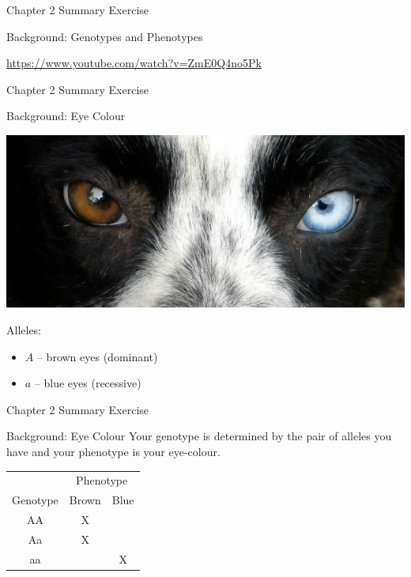 \documentclass[aspectratio=169,xcolor=pdftex,dvipsnames,table]{beamer}\usepackage[]{graphicx}\usepackage[]{xcolor}
\begin{document}
\begin{frame}{Chapter 2 Summary Exercise}
 
  \begin{block}{Background: Genotypes and Phenotypes}
  \begin{center}
  \url{https://www.youtube.com/watch?v=ZmE0Q4no5Pk}
  \end{center}
  \end{block}
\end{frame}

\begin{frame}{Chapter 2 Summary Exercise}
  
  \begin{block}{Background: Eye Colour}
  \begin{center}
    \includegraphics[height = .3\textheight]{1412513462}
  \end{center}
  
  \medskip
  Alleles:
  \begin{itemize}
  \item $A$ -- brown eyes (dominant)
  \item $a$ -- blue eyes (recessive)
  \end{itemize}
  \end{block}
\end{frame}

\begin{frame}{Chapter 2 Summary Exercise}

  \begin{block}{Background: Eye Colour}
  Your genotype is determined by the pair of alleles you have and your phenotype is your eye-colour. 
  
  \begin{center}
  \begin{tabular}{c|cc}
  & \multicolumn{2}{c}{Phenotype}\\
  Genotype & Brown & Blue\\
  \hline
  \hline
  AA & X & \\
  Aa & X & \\
  aa &   & X\\
  \end{tabular}
  \end{center}

  \end{block}
\end{frame}
\end{document}
